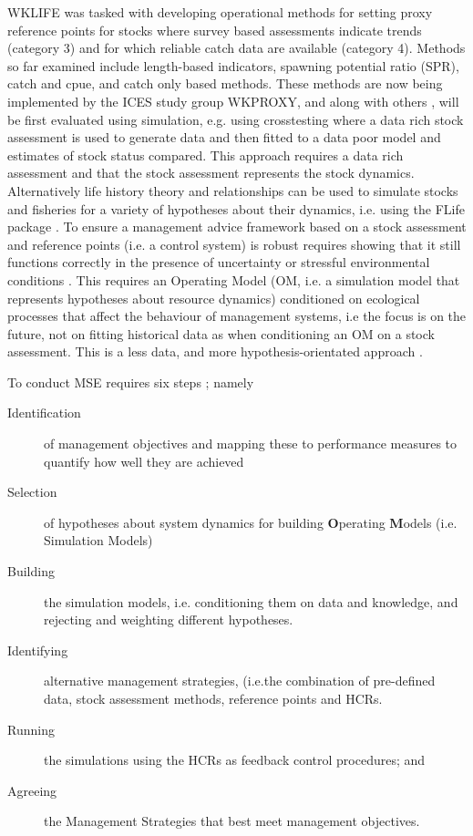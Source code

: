 \documentclass[a4paper, 10pt]{article}
\begin{document}
WKLIFE was tasked with developing operational methods for setting proxy reference points for stocks where survey based assessments indicate trends (category 3) and for which reliable catch data are available (category 4). Methods so far examined include length-based indicators, spawning potential ratio (SPR), catch and cpue, and catch only based methods. These methods are now being implemented by the ICES study group WKPROXY, and along with others \citep[][]{thorson2015introduction, carruthers2014evaluating}, will be first evaluated using simulation, e.g. using crosstesting where a data rich stock assessment is used to generate data and then fitted to a data poor model and estimates of stock status compared. This approach requires a data rich assessment and that the stock assessment represents the stock dynamics. Alternatively life history theory and relationships can be used to simulate stocks and fisheries for a variety of hypotheses about their dynamics, i.e. using the FLife package \citep[see][]{rosenberg2014developing}.
To ensure a management advice framework based on a stock assessment and reference points (i.e. a control system) is robust requires showing that it still functions correctly in the presence of uncertainty or stressful environmental conditions \citep{radatz1990ieee}. This requires an Operating Model (OM, i.e. a simulation model that represents hypotheses about resource dynamics) conditioned on ecological processes that affect the behaviour of management systems, i.e the focus is on the future, not on fitting historical data as when conditioning an OM on a stock assessment. This is a less data, and more hypothesis-orientated approach \citep{kell2006operational}. 

To conduct MSE requires six steps \citep{punt2007developing}; namely

  \begin{description}%
    \item[Identification] of management objectives and mapping these to performance measures to quantify how well they are achieved\
    \item[Selection] of hypotheses about system dynamics for building \textbf{O}perating \textbf{M}odels (i.e. Simulation Models)
    \item[Building] the simulation models, i.e. conditioning them on data and knowledge, and rejecting and weighting different hypotheses.
    \item[Identifying] alternative management strategies, (i.e.the combination of pre-defined data, stock assessment methods, reference points and HCRs.
    \item[Running] the simulations using the HCRs as feedback control procedures; and
    \item[Agreeing] the Management Strategies that best meet management objectives.
 \end{description}
\end{document}
